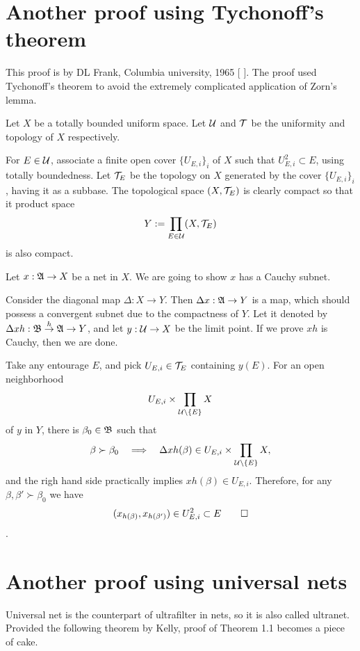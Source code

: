 \documentclass{../exp}
\begin{document}
\section{Another proof using Tychonoff's theorem}
This proof is by DL Frank, Columbia university, 1965 [ ].
The proof used Tychonoff's theorem to avoid the extremely complicated application of Zorn's lemma.

\begin{pf}[2 of Theorem 1.1]
Let $X$ be a totally bounded uniform space.
Let $\mathcal{U}$ and $\mathcal{T}$ be the uniformity and topology of $X$ respectively.

For $E\in\mathcal{U}$, associate a finite open cover $\{U_{E,i}\}_i$ of $X$ such that $U_{E,i}^2\subset E$, using totally boundedness.
Let $\mathcal{T}_E$ be the topology on $X$ generated by the cover $\{U_{E,i}\}_i$, having it as a subbase.
The topological space $(X,\mathcal{T}_E)$ is clearly compact so that it product space
\[Y:=\prod_{E\in\mathcal{U}}(X,\mathcal{T}_E)\]
is also compact.

Let $x:\fA\to X$ be a net in $X$.
We are going to show $x$ has a Cauchy subnet.

Consider the diagonal map $\Delta:X\to Y$.
Then $\Delta x:\fA\to Y$ is a map, which should possess a convergent subnet due to the compactness of $Y$.
Let it denoted by $\Delta xh:\fB\to{h}\fA\to Y$, and let $y:\cU\to X$ be the limit point.
If we prove $xh$ is Cauchy, then we are done.

Take any entourage $E$, and pick $U_{E,i}\in\mathcal{T}_E$ containing $y(E)$.
For an open neighborhood
\[U_{E,i}\times\prod_{\mathcal{U}\setminus\{E\}}X\]
of $y$ in $Y$, there is $\beta_0\in\mathfrak{B}$ such that
\[\beta\succ\beta_0\impl\Delta xh(\beta)\in U_{E,i}\x\prod_{\cU\setminus\{E\}}X,\]
and the righ hand side practically implies $xh(\beta)\in U_{E,i}$.
Therefore, for any $\beta,\beta'\succ\beta_0$ we have
\[(x_{h(\beta)},x_{h(\beta')})\in U_{E,i}^2\subset E\qedhere\].
\end{pf}







\section{Another proof using universal nets}

Universal net is the counterpart of ultrafilter in nets, so it is also called ultranet.
Provided the following theorem by Kelly, proof of Theorem 1.1 becomes a piece of cake.
\end{document}
